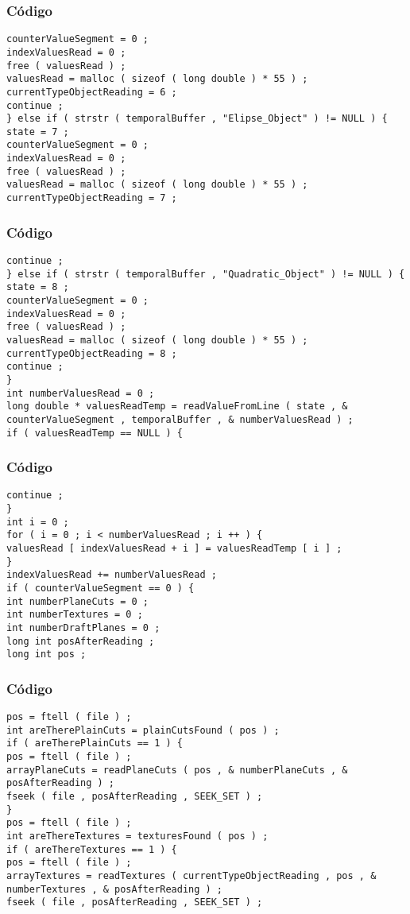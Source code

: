 \documentclass{beamer}
\begin{document}
\begin{frame}[fragile]
\frametitle{C\'odigo}
\begin{verbatim}
counterValueSegment = 0 ; 
indexValuesRead = 0 ; 
free ( valuesRead ) ; 
valuesRead = malloc ( sizeof ( long double ) * 55 ) ; 
currentTypeObjectReading = 6 ; 
continue ; 
} else if ( strstr ( temporalBuffer , "Elipse_Object" ) != NULL ) { 
state = 7 ; 
counterValueSegment = 0 ; 
indexValuesRead = 0 ; 
free ( valuesRead ) ; 
valuesRead = malloc ( sizeof ( long double ) * 55 ) ; 
currentTypeObjectReading = 7 ; 
\end{verbatim}
\end{frame}
\begin{frame}[fragile]
\frametitle{C\'odigo}
\begin{verbatim}
continue ; 
} else if ( strstr ( temporalBuffer , "Quadratic_Object" ) != NULL ) { 
state = 8 ; 
counterValueSegment = 0 ; 
indexValuesRead = 0 ; 
free ( valuesRead ) ; 
valuesRead = malloc ( sizeof ( long double ) * 55 ) ; 
currentTypeObjectReading = 8 ; 
continue ; 
} 
int numberValuesRead = 0 ; 
long double * valuesReadTemp = readValueFromLine ( state , & counterValueSegment , temporalBuffer , & numberValuesRead ) ; 
if ( valuesReadTemp == NULL ) { 
\end{verbatim}
\end{frame}
\begin{frame}[fragile]
\frametitle{C\'odigo}
\begin{verbatim}
continue ; 
} 
int i = 0 ; 
for ( i = 0 ; i < numberValuesRead ; i ++ ) { 
valuesRead [ indexValuesRead + i ] = valuesReadTemp [ i ] ; 
} 
indexValuesRead += numberValuesRead ; 
if ( counterValueSegment == 0 ) { 
int numberPlaneCuts = 0 ; 
int numberTextures = 0 ; 
int numberDraftPlanes = 0 ; 
long int posAfterReading ; 
long int pos ; 
\end{verbatim}
\end{frame}
\begin{frame}[fragile]
\frametitle{C\'odigo}
\begin{verbatim}
pos = ftell ( file ) ; 
int areTherePlainCuts = plainCutsFound ( pos ) ; 
if ( areTherePlainCuts == 1 ) { 
pos = ftell ( file ) ; 
arrayPlaneCuts = readPlaneCuts ( pos , & numberPlaneCuts , & posAfterReading ) ; 
fseek ( file , posAfterReading , SEEK_SET ) ; 
} 
pos = ftell ( file ) ; 
int areThereTextures = texturesFound ( pos ) ; 
if ( areThereTextures == 1 ) { 
pos = ftell ( file ) ; 
arrayTextures = readTextures ( currentTypeObjectReading , pos , & numberTextures , & posAfterReading ) ; 
fseek ( file , posAfterReading , SEEK_SET ) ; 
\end{verbatim}
\end{frame}
\end{document}
